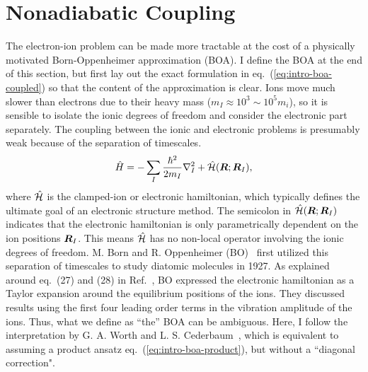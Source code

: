 \chapter{Nonadiabatic Coupling} \label{app:nad}

The electron-ion problem can be made more tractable at the cost of a physically motivated Born-Oppenheimer approximation (BOA). I define the BOA at the end of this section, but first lay out the exact formulation in eq.~(\ref{eq:intro-boa-coupled}) so that the content of the approximation is clear.
Ions move much slower than electrons due to their heavy mass ($m_I\approx 10^3\sim 10^5 m_i$), so it is sensible to isolate the ionic degrees of freedom and consider the electronic part separately. The coupling between the ionic and electronic problems is presumably weak because of the separation of timescales.
\begin{align} \label{eq:intro-ei-to-e-ham}
\hat{H} = -\sum_I \frac{\hbar^2}{2m_I} \nabla^2_I
+ \hat{\mathcal{H}}(\boldsymbol{R};\boldsymbol{R}_I),
\end{align}
where $\hat{\mathcal{H}}$ is the clamped-ion or electronic hamiltonian, which typically defines the ultimate goal of an electronic structure method. The semicolon in $\hat{\mathcal{H}}(\boldsymbol{R};\boldsymbol{R}_I)$ indicates that the electronic hamiltonian is only parametrically dependent on the ion positions $\boldsymbol{R}_I$. This means $\hat{\mathcal{H}}$ has no non-local operator involving the ionic degrees of freedom. M. Born and R. Oppenheimer (BO)~\cite{Born1927} first utilized this separation of timescales to study diatomic molecules in 1927. As explained around eq.~(27) and (28) in Ref.~\cite{Born1927}, BO expressed the electronic hamiltonian as a Taylor expansion around the equilibrium positions of the ions. They discussed results using the first four leading order terms in the vibration amplitude of the ions. Thus, what we define as ``the'' BOA can be ambiguous. Here, I follow the interpretation by G. A. Worth and L. S. Cederbaum~\cite{Worth2004}, which is equivalent to assuming a product ansatz eq.~(\ref{eq:intro-boa-product}), but without a ``diagonal correction".

